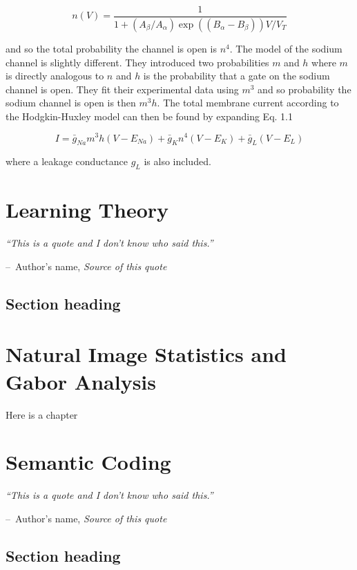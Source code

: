 \documentclass[a4paper,11pt]{book}
\makeatletter
\newenvironment{chapquote}[2][2em]
  {\setlength{\@tempdima}{#1}%
   \def\chapquote@author{#2}%
   \parshape 1 \@tempdima \dimexpr\textwidth-2\@tempdima\relax%
   \itshape}
  {\par\normalfont\hfill--\ \chapquote@author\hspace*{\@tempdima}\par\bigskip}
\makeatother
\begin{document}
\begin{equation}
n(V) = \frac{1}{1+(A_{\beta}/A_{\alpha})\exp ((B_{\alpha} - B_{\beta}))V/V_{T}}
\end{equation}

and so the total probability the channel is open is $n^{4}$. The model of the sodium channel is slightly different. They introduced two probabilities $m$ and $h$ where $m$ is directly analogous to $n$ and $h$ is the probability that a gate on the sodium channel is open. They fit their experimental data using $m^{3}$ and so  probability the sodium channel is open is then $m^{3}h$. The total membrane current according to the Hodgkin-Huxley model can then be found by expanding Eq. 1.1

\begin{equation}
I = \bar{g}_{Na}m^{3}h(V-E_{Na}) + \bar{g}_{K}n^{4}(V-E_{K}) + \bar{g}_{L}(V-E_{L})
\end{equation}

where a leakage conductance $g_{L}$ is also included.

\chapter{Learning Theory}

\begin{chapquote}{Author's name, \textit{Source of this quote}}
``This is a quote and I don't know who said this.''
\end{chapquote}

\section{Section heading}


\chapter{Natural Image Statistics and Gabor Analysis}

Here is a chapter

\chapter{Semantic Coding}

\begin{chapquote}{Author's name, \textit{Source of this quote}}
``This is a quote and I don't know who said this.''
\end{chapquote}

\section{Section heading}
\end{document}
